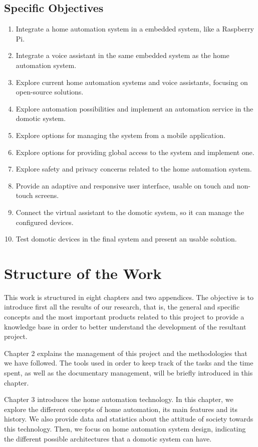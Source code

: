 \subsection{Specific Objectives}
\begin{enumerate}
	\item Integrate a home automation system in a embedded system, like a Raspberry Pi.
	\item Integrate a voice assistant in the same embedded system as the home automation system.
	\item Explore current home automation systems and voice assistants, focusing on open-source solutions.
	\item Explore automation possibilities and implement an automation service in the domotic system.
	\item Explore options for managing the system from a mobile application.
	\item Explore options for providing global access to the system and implement one.
	\item Explore safety and privacy concerns related to the home automation system.
	\item Provide an adaptive and responsive user interface, usable on touch and non-touch screens.
	\item Connect the virtual assistant to the domotic system, so it can manage the configured devices.
	\item Test domotic devices in the final system and present an usable solution.
\end{enumerate}

\bigskip
\section{Structure of the Work}
This work is structured in eight chapters and two appendices. The objective is to introduce first all the results of our research, 
that is, the general and specific concepts and the most important products related to this project to provide a knowledge base 
in order to better understand the development of the resultant project.

Chapter 2 explains the management of this project and the methodologies that we have followed. The tools used in order to keep track
of the tasks and the time spent, as well as the documentary management, will be briefly introduced in this chapter.

Chapter 3 introduces the home automation technology. In this chapter, we explore the different concepts of home automation,
its main features and its history. We also provide data and statistics about the attitude of society towards this technology. Then,
we focus on home automation system design, indicating the different possible architectures that a domotic system can have.

